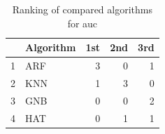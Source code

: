 \begin{table}
\footnotesize
\caption{Ranking of compared algorithms for auc}
\label{tab:places auc}
\begin{tabular}{llrrr}
\hline
 & Algorithm & 1st & 2nd & 3rd \\
\hline
1 & ARF & 3 & 0 & 1 \\
2 & KNN & 1 & 3 & 0 \\
3 & GNB & 0 & 0 & 2 \\
4 & HAT & 0 & 1 & 1 \\
\hline
\end{tabular}
\end{table}
